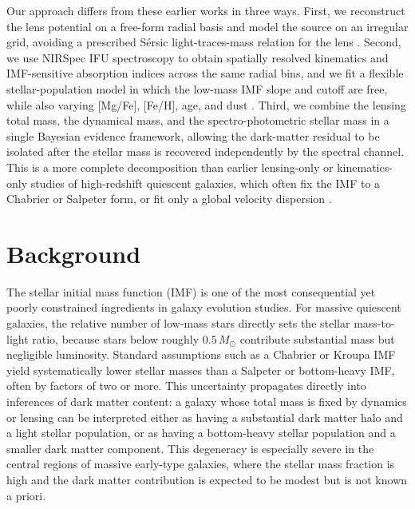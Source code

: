 \documentclass{article}
\begin{document}
Our approach differs from these earlier works in three ways. First, we reconstruct the lens potential on a free-form radial basis and model the source on an irregular grid, avoiding a prescribed S\'ersic light-traces-mass relation for the lens \cite{saha2004,coles2014,nightingale2015}. Second, we use NIRSpec IFU spectroscopy to obtain spatially resolved kinematics and IMF-sensitive absorption indices across the same radial bins, and we fit a flexible stellar-population model in which the low-mass IMF slope and cutoff are free, while also varying [Mg/Fe], [Fe/H], age, and dust \cite{conroy2012,labarbera2013}. Third, we combine the lensing total mass, the dynamical mass, and the spectro-photometric stellar mass in a single Bayesian evidence framework, allowing the dark-matter residual to be isolated after the stellar mass is recovered independently by the spectral channel. This is a more complete decomposition than earlier lensing-only or kinematics-only studies of high-redshift quiescent galaxies, which often fix the IMF to a Chabrier or Salpeter form, or fit only a global velocity dispersion \cite{newman2013,toft2017}.

\section{Background}

The stellar initial mass function (IMF) is one of the most consequential yet poorly constrained ingredients in galaxy evolution studies. For massive quiescent galaxies, the relative number of low-mass stars directly sets the stellar mass-to-light ratio, because stars below roughly $0.5\,M_\odot$ contribute substantial mass but negligible luminosity. Standard assumptions such as a Chabrier or Kroupa IMF yield systematically lower stellar masses than a Salpeter or bottom-heavy IMF, often by factors of two or more. This uncertainty propagates directly into inferences of dark matter content: a galaxy whose total mass is fixed by dynamics or lensing can be interpreted either as having a substantial dark matter halo and a light stellar population, or as having a bottom-heavy stellar population and a smaller dark matter component. This degeneracy is especially severe in the central regions of massive early-type galaxies, where the stellar mass fraction is high and the dark matter contribution is expected to be modest but is not known a priori.
\end{document}

